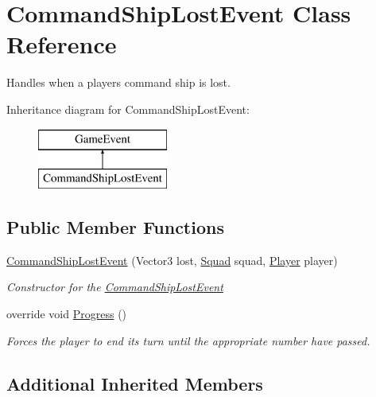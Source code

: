 \hypertarget{class_command_ship_lost_event}{}\section{Command\+Ship\+Lost\+Event Class Reference}
\label{class_command_ship_lost_event}


Handles when a player\textquotesingle{}s command ship is lost.  


Inheritance diagram for Command\+Ship\+Lost\+Event\+:\begin{figure}[H]
\begin{center}
\leavevmode
\includegraphics[height=2.000000cm]{class_command_ship_lost_event}
\end{center}
\end{figure}
\subsection*{Public Member Functions}
\begin{DoxyCompactItemize}
\item 
\hyperlink{class_command_ship_lost_event_ad36a964661cb1c49bb0768cdedeed8f2}{Command\+Ship\+Lost\+Event} (Vector3 lost, \hyperlink{class_squad}{Squad} squad, \hyperlink{class_player}{Player} player)
\begin{DoxyCompactList}\small\item\em Constructor for the \hyperlink{class_command_ship_lost_event}{Command\+Ship\+Lost\+Event} \end{DoxyCompactList}\item 
override void \hyperlink{class_command_ship_lost_event_ae40df10e4b39aa564af5c8a2a24c5bed}{Progress} ()
\begin{DoxyCompactList}\small\item\em Forces the player to end its turn until the appropriate number have passed. \end{DoxyCompactList}\end{DoxyCompactItemize}
\subsection*{Additional Inherited Members}


